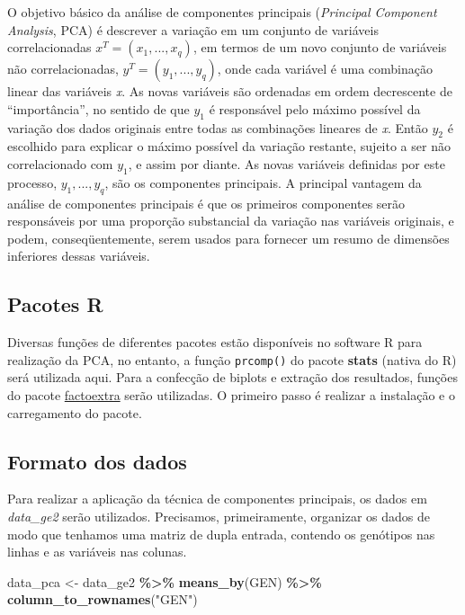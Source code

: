 \documentclass[
]{book}
\newenvironment{Shaded}{\begin{snugshade}}{\end{snugshade}}
\newcommand{\KeywordTok}[1]{\textcolor[rgb]{0.13,0.29,0.53}{\textbf{#1}}}
\newcommand{\NormalTok}[1]{#1}
\newcommand{\OperatorTok}[1]{\textcolor[rgb]{0.81,0.36,0.00}{\textbf{#1}}}
\newcommand{\StringTok}[1]{\textcolor[rgb]{0.31,0.60,0.02}{#1}}
\numberwithin{equation}{section}
\begin{document}
O objetivo básico da análise de componentes principais (\emph{Principal Component Analysis}, PCA) é descrever a variação em um conjunto de variáveis correlacionadas \(x^T = (x_1, ..., x_q)\), em termos de um novo conjunto de variáveis não correlacionadas, \(y^T = (y_1, ..., y_q)\), onde cada variável é uma combinação linear das variáveis \emph{x}. As novas variáveis são ordenadas em ordem decrescente de ``importância'', no sentido de que \(y_1\) é responsável pelo máximo possível da variação dos dados originais entre todas as combinações lineares de \emph{x}. Então \(y_2\) é escolhido para explicar o máximo possível da variação restante, sujeito a ser não correlacionado com \(y_1\), e assim por diante. As novas variáveis definidas por este processo, \(y_1, ..., y_q\), são os componentes principais. A principal vantagem da análise de componentes principais é que os primeiros componentes serão responsáveis por uma proporção substancial da variação nas variáveis originais, e podem, conseqüentemente, serem usados para fornecer um resumo de dimensões inferiores dessas variáveis.

\hypertarget{pacotes-r}{%
\subsection{Pacotes R}\label{pacotes-r}}

Diversas funções de diferentes pacotes estão disponíveis no software R para realização da PCA, no entanto, a função \texttt{prcomp()} do pacote \textbf{stats} (nativa do R) será utilizada aqui. Para a confecção de biplots e extração dos resultados, funções do pacote \href{https://rpkgs.datanovia.com/factoextra/index.html}{factoextra} serão utilizadas. O primeiro passo é realizar a instalação e o carregamento do pacote.

\hypertarget{formato-dos-dados}{%
\subsection{Formato dos dados}\label{formato-dos-dados}}

Para realizar a aplicação da técnica de componentes principais, os dados em \emph{data\_ge2} serão utilizados. Precisamos, primeiramente, organizar os dados de modo que tenhamos uma matriz de dupla entrada, contendo os genótipos nas linhas e as variáveis nas colunas.

\begin{Shaded}
\begin{Highlighting}[]

\NormalTok{data\_pca \textless{}{-}}\StringTok{ }
\StringTok{  }\NormalTok{data\_ge2 }\OperatorTok{\%\textgreater{}\%}\StringTok{ }
\StringTok{  }\KeywordTok{means\_by}\NormalTok{(GEN) }\OperatorTok{\%\textgreater{}\%}\StringTok{ }
\StringTok{  }\KeywordTok{column\_to\_rownames}\NormalTok{(}\StringTok{"GEN"}\NormalTok{)}
\end{Highlighting}
\end{Shaded}
\end{document}

